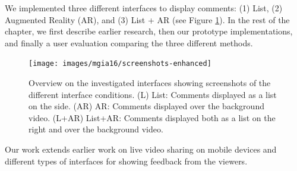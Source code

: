 
We implemented three different interfaces to display comments: (1) List, (2) Augmented Reality (AR), and (3) List + AR (see Figure \ref{fig:mgia16:conditions}). In the rest of the chapter, we first describe earlier research, then our prototype implementations, and finally a user evaluation comparing the three different methods. 

\begin{figure}
  \texttt{[image: images/mgia16/screenshots-enhanced]}
  \caption{Overview on the investigated interfaces showing screenshots of the different interface conditions. (L) List: Comments displayed as a list on the side. (AR) AR: Comments displayed over the background video. (L+AR) List+AR: Comments displayed both as a list on the right and over the background video. }
  \label{fig:mgia16:conditions}
\end{figure}


Our work extends earlier work on live video sharing on mobile devices and different types of interfaces for showing feedback from the viewers. 


 

